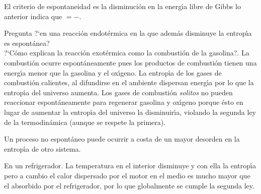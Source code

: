 El criterio de espontaneidad es la disminuci\'on en la energ\'{\i}a libre de Gibbs lo anterior indica que 
$ = -$.

Pregunta ?`en una reacci\'on endot\'ermica en la que adem\'as disminuye la entrop\'{\i}a es
espont\'anea?\\ 
?`C\'omo explican la reacci\'on exot\'ermica como la combusti\'on de la gasolina?.
La combusti\'on ocurre  espont\'aneamente pues los productos de combusti\'on tienen una energ\'{\i}a menor que la gasolina y el ox\'{\i}geno. La entrop\'{\i}a de los gases de combusti\'on calientes, al difundirse en el ambiente dispersan e\-nerg\'{\i}a por lo que la entrop\'{\i}a del universo aumenta. Los gases de com\-busti\'on \textit{solitos} no pueden reaccionar espont\'aneamente para regenerar gasolina y ox\'{\i}geno porque \'esto en lugar de aumentar la entrop\'{\i}a del universo la disminuir\'{\i}a, violando la segunda ley de la termodin\'amica (aunque se respete la primera).

Un proceso no espont\'aneo puede ocurrir a costa de un mayor desorden en la entrop\'{\i}a de otro sistema.

En un refrigerador. La temperatura en el interior disminuye y con ella la entrop\'{\i}a pero
a cambio el calor dispersado por el motor en el medio es mucho mayor que el absorbido por el
refrigerador, por lo que globalmente se cumple la segunda ley.

